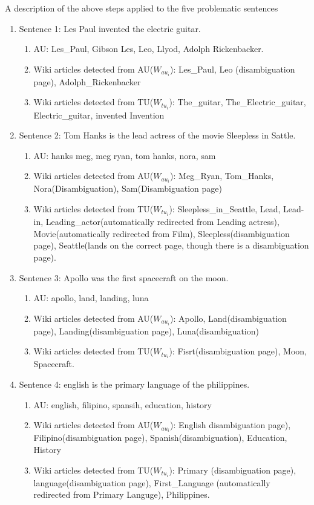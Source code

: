 \documentclass[11pt]{article}
\begin{document}
A description of the above steps applied to the five problematic sentences
\begin{enumerate}
\item Sentence 1: Les Paul invented the electric guitar.
\begin{enumerate}
\item AU: Les\_Paul, Gibson Les, Leo, Llyod, Adolph Rickenbacker. 
\item Wiki articles detected from AU($W_{au_{i}}$): Les\_Paul, Leo (disambiguation page), Adolph\_Rickenbacker 
\item Wiki articles detected from TU($W_{tu_{i}}$): The\_guitar, The\_Electric\_guitar, Electric\_guitar, invented Invention 
\end{enumerate}



\item Sentence 2: Tom Hanks is the lead actress of the movie Sleepless in Sattle.
\begin{enumerate}
\item AU: hanks meg, meg ryan, tom hanks, nora, sam
\item Wiki articles detected from AU($W_{au_{i}}$): Meg\_Ryan, Tom\_Hanks, Nora(Disambiguation), Sam(Disambiguation page) 
\item Wiki articles detected from TU($W_{tu_{i}}$): Sleepless\_in\_Seattle, Lead, Lead-in, Leading\_actor(automatically redirected from Leading actress), Movie(automatically redirected from Film), Sleepless(disambiguation page), Seattle(lands on the correct page, though there is a disambiguation page).
\end{enumerate}

\item Sentence 3: Apollo was the first spacecraft on the moon.
\begin{enumerate}
\item AU: apollo, land, landing, luna
\item Wiki articles detected from AU($W_{au_{i}}$): Apollo, Land(disambiguation page), Landing(disambiguation page), Luna(disambiguation)
\item Wiki articles detected from TU($W_{tu_{i}}$): Fisrt(disambiguation page), Moon, Spacecraft.
\end{enumerate}

\item Sentence 4: english is the primary language of the philippines.
\begin{enumerate}
\item AU: english, filipino, spansih, education, history
\item Wiki articles detected from AU($W_{au_{i}}$): English disambiguation page), Filipino(disambiguation page), Spanish(disambiguation), Education, History
\item Wiki articles detected from TU($W_{tu_{i}}$): Primary (disambiguation page), language(disambiguation page), First\_Language (automatically redirected from Primary Languge), Philippines.


\end{enumerate}
\end{enumerate}
\end{document}

